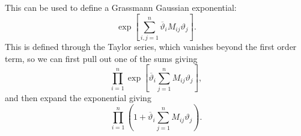 This can be used to define a Grassmann Gaussian exponential:
\begin{equation}
    \exp\left[ \sum_{i, j=1}^n \overbar{\vartheta}_i M_{ij} \vartheta_j \right].
\end{equation}
This is defined through the Taylor series, which vanishes beyond the first order term, so we can first pull out one of the sums giving
\begin{equation}
    \prod_{i = 1}^n \exp\left[ \overbar{\vartheta}_i \sum_{j=1}^n M_{ij} \vartheta_j \right],
\end{equation}
and then expand the exponential giving
\begin{equation}
    \prod_{i=1}^n \left( 1 + \overbar{\vartheta}_i \sum_{j=1}^n M_{ij}\vartheta_j \right).
\end{equation}